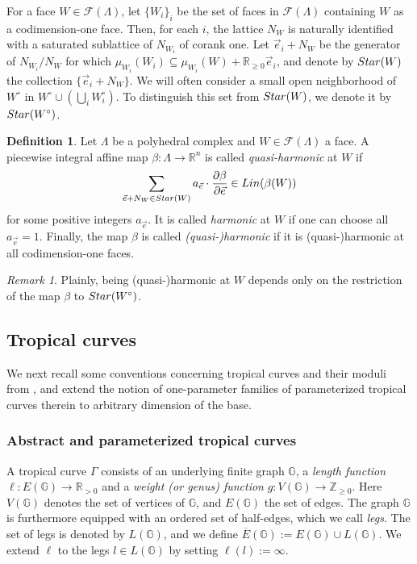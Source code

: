 \documentclass[11pt,reqno]{amsart}
\numberwithin{equation}{section}
\theoremstyle{definition}
\newtheorem{defn}[thm]{Definition}
\newcommand{\Lin}{{\rm Lin}}
\newcommand{\RR}{{\mathbb R}}
\newcommand{\GG}{{\mathbb G}}
\newcommand{\Star}{{\rm Star}}
\theoremstyle{remark}
\newtheorem{rem}[thm]{Remark}
\begin{document}
For a face $W\in\mathcal F(\Lambda)$, let $\{W_i\}_i$ be the set of faces in $\mathcal F(\Lambda)$ containing $W$ as a codimension-one face. Then, for each $i$, the lattice $N_W$ is naturally identified with a saturated sublattice of $N_{W_i}$ of corank one. Let $\vec e_i+N_W$ be the generator of $N_{W_i}/N_W$ for which $\mu_{W_i}(W_i)\subseteq \mu_{W_i}(W)+\mathbb R_{\geq 0}\vec e_i$, and denote by $\Star(W)$ the collection $\{\vec e_i+N_W\}$. We will often consider a small open neighborhood of $W^\circ$ in $W^\circ\cup\left(\bigcup_iW_i^\circ\right)$. To distinguish this set from $\Star(W)$, we denote it by $\Star(W^\circ)$.

\begin{defn}\label{defn:balancing}
    Let $\Lambda$ be a polyhedral complex and $W\in \mathcal F(\Lambda)$ a face. A piecewise integral affine map $\beta\colon\Lambda\rightarrow \RR^n$ is called \textit{quasi-harmonic} at $W$ if 
    $$ \sum_{\vec e+N_W\in\Star(W)}a_{\vec e}\cdot \frac{\partial \beta}{\partial \vec e}\in\Lin(\beta(W))$$
    for some positive integers $a_{\vec e}$. It is called \textit{harmonic} at $W$ if one can choose all $a_{\vec e}=1$. Finally, the map $\beta$ is called {\em (quasi-)harmonic} if it is (quasi-)harmonic at all codimension-one faces. 
\end{defn}

\begin{rem}
    Plainly, being (quasi-)harmonic at $W$ depends only on the restriction of the map $\beta$ to $\Star(W^\circ)$.
\end{rem}


\subsection{Tropical curves} We next recall some conventions concerning tropical curves and their moduli from \cite{CHT23,CHT22}, and extend the notion of one-parameter families of parameterized tropical curves therein to arbitrary dimension of the base. 
\subsubsection{Abstract and parameterized tropical curves}
A tropical curve $\Gamma$ consists of an underlying finite graph $\GG$, a {\em length function} $\ell\colon E(\mathbb G)\rightarrow \mathbb R_{>0}$ and a {\em weight (or genus) function} $g\colon V(\mathbb G)\rightarrow \mathbb Z_{\geq 0}$.
Here $V(\GG)$ denotes the set of vertices of $\GG$, and  $E(\GG)$ the set of edges.
The graph $\GG$ is furthermore equipped with an ordered set of half-edges, which we call {\em legs}. The set of legs is denoted by $L(\GG)$, and we define $\overline E(\mathbb G):=E(\GG)\cup L(\GG)$. We extend $\ell$ to the legs $l \in L(\GG)$ by setting $\ell(l):=\infty$.
\end{document}
